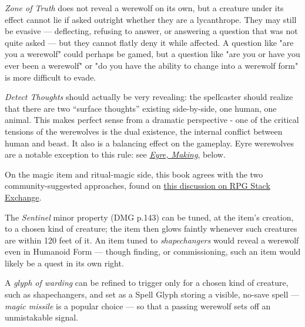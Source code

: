 \documentclass[twocolumn]{dndbook}
\begin{document}
\emph{Zone of Truth} does not reveal a werewolf on its own, but a creature under its effect cannot lie if asked outright whether they are a lycanthrope.
They may still be evasive --- deflecting, refusing to answer, or answering a question that was not quite asked --- but they cannot flatly deny it while affected.
A question like "are you a werewolf" could perhaps be gamed, but a question like "are you or have you ever been a werewolf" or "do you have the ability to change into a werewolf form" is more difficult to evade.\par

\emph{Detect Thoughts} should actually be very revealing:
the spellcaster should realize that there are two ``surface thoughts'' existing side-by-side, one human, one animal.
This makes perfect sense from a dramatic perspective - one of the critical tensions of the werewolves is the dual existence, the internal conflict between human and beast.
It also is a balancing effect on the gameplay.
Eyre werewolves are a notable exception to this rule: see \hyperref[sec:eyre]{\emph{Eyre, Making}}, below.\par

On the magic item and ritual-magic side, this book agrees with the two community-suggested approaches, found on \href{https://rpg.stackexchange.com/questions/182083/is-there-a-spell-or-item-that-can-detect-lycanthropes-while-they-are-in-their-hu}{this discussion on RPG Stack Exchange}.\par

The \emph{Sentinel} minor property (DMG p.143) can be tuned, at the item's creation, to a chosen kind of creature; the item then glows faintly whenever such creatures are within 120 feet of it.
An item tuned to \emph{shapechangers} would reveal a werewolf even in Humanoid Form --- though finding, or commissioning, such an item would likely be a quest in its own right.\par

A \emph{glyph of warding} can be refined to trigger only for a chosen kind of creature, such as shapechangers, and set as a Spell Glyph storing a visible, no-save spell --- \emph{magic missile} is a popular choice --- so that a passing werewolf sets off an unmistakable signal.\par
\end{document}
